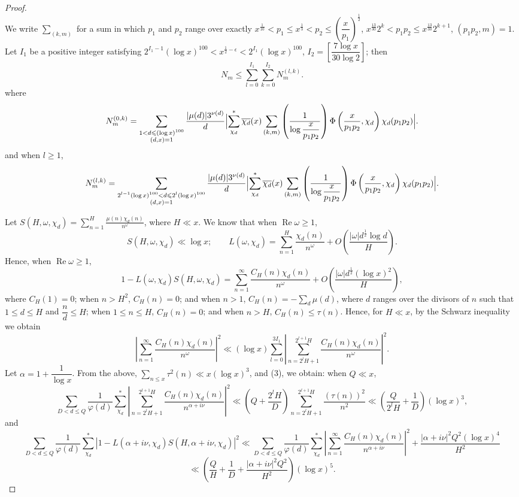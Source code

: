 \begin{proof}
\[\]
We write $\displaystyle\sum_{(k,m)}$ for a sum in which $p_1$ and $p_2$ range over exactly $x^{\frac1{10}}<p_1\leqslant x^{\frac13}<p_2\leqslant\left(\dfrac{x}{p_1}\right)^{\frac12}$, $x^{\frac{13}{30}}2^k<p_1p_2\leqslant x^{\frac{13}{30}}2^{k+1}$, $(p_1p_2,m)=1$. Let $I_1$ be a positive integer satisfying $2^{I_1-1}(\log x)^{100}<x^{\frac12-\epsilon}<2^{I_1}(\log x)^{100}$, $I_2=\left[\dfrac{7\log x}{30\log2}\right]$; then
\begin{equation}\label{eq:chen13en}
N_m\leqslant\sum_{l=0}^{I_1}\sum_{k=0}^{I_2}N_m^{(l,k)}.
\end{equation}
where
\[
N_m^{(0,k)}=\sum_{\substack{1<d\leqslant(\log x)^{100}\\(d,x)=1}}\frac{|\mu(d)|3^{\nu(d)}}{d}
\Bigl|\sum_{\chi_d}^{*}\overline{\chi_d}(x)\sum_{(k,m)}\left(\frac1{\log\dfrac{x}{p_1p_2}}\right)\Phi\left(\frac{x}{p_1p_2},\chi_d\right)\chi_d(p_1p_2)\Bigr|.
\]
and when $l\geqslant1$,
\[
N_m^{(l,k)}=\sum_{\substack{2^{l-1}(\log x)^{100}<d\leqslant2^l(\log x)^{100}\\(d,x)=1}}\frac{|\mu(d)|3^{\nu(d)}}{d}
\Bigl|\sum_{\chi_d}^{*}\overline{\chi_d}(x)\sum_{(k,m)}\left(\frac1{\log\dfrac{x}{p_1p_2}}\right)\Phi\left(\frac{x}{p_1p_2},\chi_d\right)\chi_d(p_1p_2)\Bigr|.
\]

Let $S(H,\omega,\chi_d)=\displaystyle\sum_{n=1}^{H}\frac{\mu(n)\chi_d(n)}{n^\omega}$, where $H\ll x$. We know that when $\operatorname{Re}\omega\geqslant1$,
\[
S(H,\omega,\chi_d)\ll\log x;\qquad L(\omega,\chi_d)=\sum_{n=1}^{H}\frac{\chi_d(n)}{n^\omega}+O\left(\frac{|\omega|d^{\frac12}\log d}{H}\right).
\]
Hence, when $\operatorname{Re}\omega\geqslant1$,
\[
1-L(\omega,\chi_d)S(H,\omega,\chi_d)=\sum_{n=1}^{\infty}\frac{C_H(n)\chi_d(n)}{n^\omega}+O\left(\frac{|\omega|d^{\frac12}(\log x)^2}{H}\right),
\]
where $C_H(1)=0$; when $n>H^2$, $C_H(n)=0$; and when $n>1$, $C_H(n)=-\displaystyle\sum_{d}\mu(d)$, where $d$ ranges over the divisors of $n$ such that $1\leqslant d\leqslant H$ and $\dfrac{n}{d}\leqslant H$; when $1\leqslant n\leqslant H$, $C_H(n)=0$; and when $n>H$, $C_H(n)\leqslant\tau(n)$. Hence, for $H\ll x$, by the Schwarz inequality we obtain
\[
\left|\sum_{n=1}^{\infty}\frac{C_H(n)\chi_d(n)}{n^\omega}\right|^2\ll(\log x)\sum_{l=0}^{3I_1}\left|\sum_{n=2^lH+1}^{2^{l+1}H}\frac{C_H(n)\chi_d(n)}{n^\omega}\right|^2.
\]
Let $\alpha=1+\dfrac1{\log x}$. From the above, $\displaystyle\sum_{n\leqslant x}\tau^2(n)\ll x(\log x)^3$, and (3), we obtain: when $Q\ll x$,
\[
\sum_{D<d\leqslant Q}\frac1{\varphi(d)}\sum_{\chi_d}^{*}\left|\sum_{n=2^lH+1}^{2^{l+1}H}\frac{C_H(n)\chi_d(n)}{n^{\alpha+i\nu}}\right|^2
\ll\left(Q+\frac{2^lH}{D}\right)\sum_{n=2^lH+1}^{2^{l+1}H}\frac{(\tau(n))^2}{n^2}\ll\left(\frac{Q}{2^lH}+\frac1D\right)(\log x)^3,
\]
and
\[
\sum_{D<d\leqslant Q}\frac1{\varphi(d)}\sum_{\chi_d}^{*}|1-L(\alpha+i\nu,\chi_d)S(H,\alpha+i\nu,\chi_d)|^2
\ll\sum_{D<d\leqslant Q}\frac1{\varphi(d)}\sum_{\chi_d}^{*}\left|\sum_{n=1}^{\infty}\frac{C_H(n)\chi_d(n)}{n^{\alpha+i\nu}}\right|^2+\frac{|\alpha+i\nu|^2Q^2(\log x)^4}{H^2}
\]
\begin{equation}\label{eq:chen14en}
\ll\left(\frac{Q}{H}+\frac1D+\frac{|\alpha+i\nu|^2Q^2}{H^2}\right)(\log x)^5.
\end{equation}


\end{proof}
